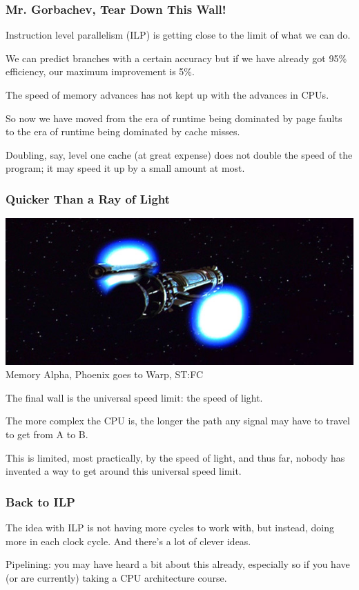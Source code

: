 \begin{frame}
\frametitle{Mr. Gorbachev, Tear Down This Wall!}

Instruction level parallelism (ILP) is getting close to the limit of what we can do. 

We can predict branches with a certain accuracy but if we have already got 95\% efficiency, our maximum improvement is 5\%.

The speed of memory advances has not kept up with the advances in CPUs. 

So now we have moved from the era of runtime being dominated by page faults to the era of runtime being dominated by cache misses. 

Doubling, say, level one cache (at great expense) does not double the speed of the program; it may speed it up by a small amount at most. 

\end{frame}



\begin{frame}
\frametitle{Quicker Than a Ray of Light}

\begin{center}
\includegraphics[width=.8\textwidth]{images/L02-phoenix-warp}\\
{\scriptsize \hfill Memory Alpha, Phoenix goes to Warp, ST:FC}
\end{center}

The final wall is the universal speed limit: the speed of light.

 The more complex the CPU is, the longer the path any signal may have to travel to get from A to B. 
 
 This is limited, most practically, by the speed of light, and thus far, nobody has invented a way to get around this universal speed limit.
\end{frame}



\begin{frame}
\frametitle{Back to ILP}

The idea with ILP is not having more cycles to work with, but instead, doing more in each clock cycle. And there's a lot of clever ideas. 

Pipelining: you may have heard a bit about this already, especially so if you have (or are currently) taking a CPU architecture course.
\end{frame}



